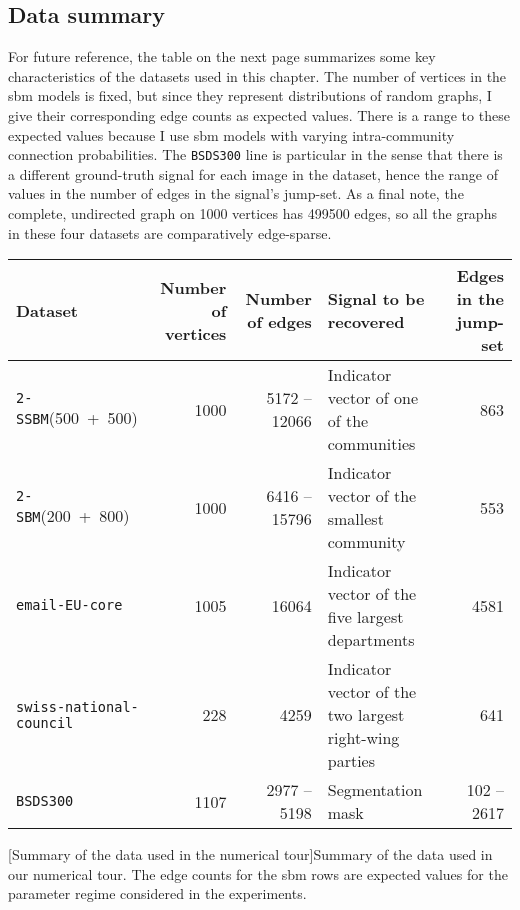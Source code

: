 \subsection{Data summary}

For future reference, the table on the next page summarizes some key characteristics of the datasets used in this chapter. The number of vertices in the \acrshort{sbm} models is fixed, but since they represent distributions of random graphs, I give their corresponding edge counts as expected values. There is a range to these expected values because I use \acrshort{sbm} models with varying intra-community connection probabilities. The \texttt{BSDS300} line is particular in the sense that there is a different ground-truth signal for each image in the dataset, hence the range of values in the number of edges in the signal's jump-set. As a final note, the complete, undirected graph on 1000 vertices has 499500 edges, so all the graphs in these four datasets are comparatively edge-sparse.

\clearpage
\begin{landscape}
    \centering
    \captionsetup{type=table}
    \begin{tabularx}{\linewidth}{p{4.5cm} r r p{5.0cm} r}
        \hline
        Dataset & Number of vertices & Number of edges & Signal to be recovered & Edges in the jump-set \\
        \hline
        \texttt{2-SSBM}(500~+~500) & 1000 & 5172 -- 12066 & Indicator vector of one of the communities & 863 \\
        \texttt{2-SBM}(200~+~800) & 1000 & 6416 -- 15796 & Indicator vector of the smallest community & 553 \\
        \texttt{email-EU-core} & 1005 & 16064 & Indicator vector of the five largest departments & 4581 \\
        \texttt{swiss-national-council} & 228 & 4259 & Indicator vector of the two largest right-wing parties & 641 \\
        \texttt{BSDS300} & 1107 & 2977 -- 5198 & Segmentation mask & 102 -- 2617 \\
        \hline
    \end{tabularx}
    [Summary of the data used in the numerical tour]{Summary of the data used in our numerical tour. The edge counts for the \acrshort{sbm} rows are expected values for the parameter regime considered in the experiments.}
\end{landscape}
\clearpage

